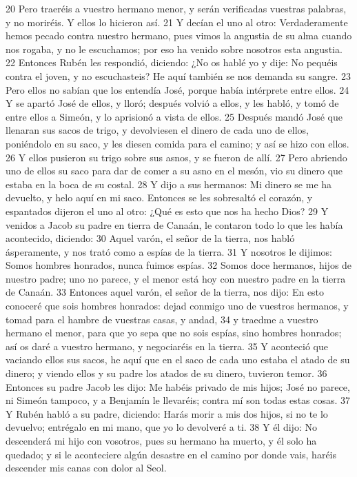 20 Pero traeréis a vuestro hermano menor, y serán verificadas vuestras palabras, y no moriréis. Y ellos lo hicieron así.
21 Y decían el uno al otro: Verdaderamente hemos pecado contra nuestro hermano, pues vimos la angustia de su alma cuando nos rogaba, y no le escuchamos; por eso ha venido sobre nosotros esta angustia.
22 Entonces Rubén les respondió, diciendo: ¿No os hablé yo y dije: No pequéis contra el joven, y no escuchasteis? He aquí también se nos demanda su sangre.
23 Pero ellos no sabían que los entendía José, porque había intérprete entre ellos.
24 Y se apartó José de ellos, y lloró; después volvió a ellos, y les habló, y tomó de entre ellos a Simeón, y lo aprisionó a vista de ellos.
25 Después mandó José que llenaran sus sacos de trigo, y devolviesen el dinero de cada uno de ellos, poniéndolo en su saco, y les diesen comida para el camino; y así se hizo con ellos.
26 Y ellos pusieron su trigo sobre sus asnos, y se fueron de allí.
27 Pero abriendo uno de ellos su saco para dar de comer a su asno en el mesón, vio su dinero que estaba en la boca de su costal.
28 Y dijo a sus hermanos: Mi dinero se me ha devuelto, y helo aquí en mi saco. Entonces se les sobresaltó el corazón, y espantados dijeron el uno al otro: ¿Qué es esto que nos ha hecho Dios?
29 Y venidos a Jacob su padre en tierra de Canaán, le contaron todo lo que les había acontecido, diciendo:
30 Aquel varón, el señor de la tierra, nos habló ásperamente, y nos trató como a espías de la tierra.
31 Y nosotros le dijimos: Somos hombres honrados, nunca fuimos espías.
32 Somos doce hermanos, hijos de nuestro padre; uno no parece, y el menor está hoy con nuestro padre en la tierra de Canaán.
33 Entonces aquel varón, el señor de la tierra, nos dijo: En esto conoceré que sois hombres honrados: dejad conmigo uno de vuestros hermanos, y tomad para el hambre de vuestras casas, y andad,
34 y traedme a vuestro hermano el menor, para que yo sepa que no sois espías, sino hombres honrados; así os daré a vuestro hermano, y negociaréis en la tierra.
35 Y aconteció que vaciando ellos sus sacos, he aquí que en el saco de cada uno estaba el atado de su dinero; y viendo ellos y su padre los atados de su dinero, tuvieron temor.
36 Entonces su padre Jacob les dijo: Me habéis privado de mis hijos; José no parece, ni Simeón tampoco, y a Benjamín le llevaréis; contra mí son todas estas cosas.
37 Y Rubén habló a su padre, diciendo: Harás morir a mis dos hijos, si no te lo devuelvo; entrégalo en mi mano, que yo lo devolveré a ti.
38 Y él dijo: No descenderá mi hijo con vosotros, pues su hermano ha muerto, y él solo ha quedado; y si le aconteciere algún desastre en el camino por donde vais, haréis descender mis canas con dolor al Seol.

